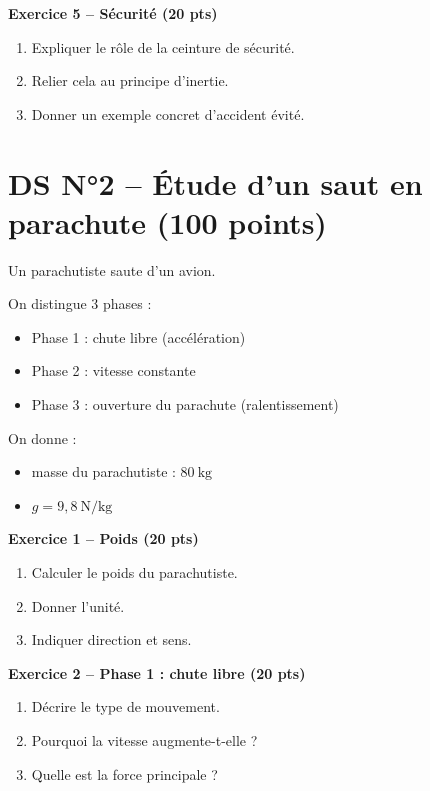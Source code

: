 \documentclass[11pt,a4paper]{article}
\begin{document}
\bigskip

\textbf{Exercice 5 – Sécurité (20 pts)}

\begin{enumerate}
\item Expliquer le rôle de la ceinture de sécurité.
\item Relier cela au principe d’inertie.
\item Donner un exemple concret d’accident évité.
\end{enumerate}

\newpage
\section*{DS N°2 – Étude d’un saut en parachute (100 points)}

Un parachutiste saute d’un avion.

On distingue 3 phases :
\begin{itemize}
\item Phase 1 : chute libre (accélération)
\item Phase 2 : vitesse constante
\item Phase 3 : ouverture du parachute (ralentissement)
\end{itemize}

On donne :
\begin{itemize}
\item masse du parachutiste : $80\ \text{kg}$
\item $g = 9{,}8\ \text{N/kg}$
\end{itemize}

\bigskip

\textbf{Exercice 1 – Poids (20 pts)}

\begin{enumerate}
\item Calculer le poids du parachutiste.
\item Donner l’unité.
\item Indiquer direction et sens.
\end{enumerate}

\bigskip

\textbf{Exercice 2 – Phase 1 : chute libre (20 pts)}

\begin{enumerate}
\item Décrire le type de mouvement.
\item Pourquoi la vitesse augmente-t-elle ?
\item Quelle est la force principale ?
\end{enumerate}
\end{document}
